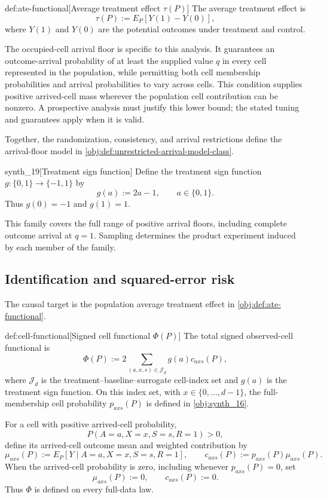 \begin{definitionv}{def:ate-functional}[Average treatment effect \(\tau(P)\)]
The average treatment effect is
\[
\tau(P):=E_P[Y(1)-Y(0)],
\]
where \(Y(1)\) and \(Y(0)\) are the potential outcomes under treatment and control.
\end{definitionv}

The occupied-cell arrival floor is specific to this analysis. It guarantees an outcome-arrival probability of at least the supplied value \(q\) in every cell represented in the population, while permitting both cell membership probabilities and arrival probabilities to vary across cells. This condition supplies positive arrived-cell mass wherever the population cell contribution can be nonzero. A prospective analysis must justify this lower bound; the stated tuning and guarantees apply when it is valid.

Together, the randomization, consistency, and arrival restrictions define the arrival-floor model  in \cref{obj:def:unrestricted-arrival-model-class}.

\begin{definitionv}{synth_19}[Treatment sign function]
Define the treatment sign function \(g:\{0,1\}\to\{-1,1\}\) by
\[
g(a):=2a-1,\qquad a\in\{0,1\}.
\]
Thus \(g(0)=-1\) and \(g(1)=1\).
\end{definitionv}

This family covers the full range of positive arrival floors, including complete outcome arrival at \(q=1\). Sampling determines the product experiment induced by each member of the family.

\subsection{Identification and squared-error risk}

The causal target is the population average treatment effect  in \cref{obj:def:ate-functional}.

\begin{definitionv}{def:cell-functional}[Signed cell functional \(\Phi(P)\)]
The total signed observed-cell functional is
\[
\Phi(P):=2\sum_{(a,x,s)\in\mathcal J_d}g(a)c_{axs}(P),
\]
where \(\mathcal J_d\) is the treatment–baseline–surrogate cell-index set and \(g(a)\) is the treatment sign function. On this index set, with \(x\in\{0,\ldots,d-1\}\), the full-membership cell probability \(p_{axs}(P)\) is defined in \cref{obj:synth_16}.

For a cell with positive arrived-cell probability,
\[
P(A=a,X=x,S=s,R=1)>0,
\]
define its arrived-cell outcome mean and weighted contribution by
\[
\mu_{axs}(P):=E_P[Y\mid A=a,X=x,S=s,R=1],
\qquad
c_{axs}(P):=p_{axs}(P)\mu_{axs}(P).
\]
When the arrived-cell probability is zero, including whenever \(p_{axs}(P)=0\), set
\[
\mu_{axs}(P):=0,
\qquad
c_{axs}(P):=0.
\]
Thus \(\Phi\) is defined on every full-data law.
\end{definitionv}

